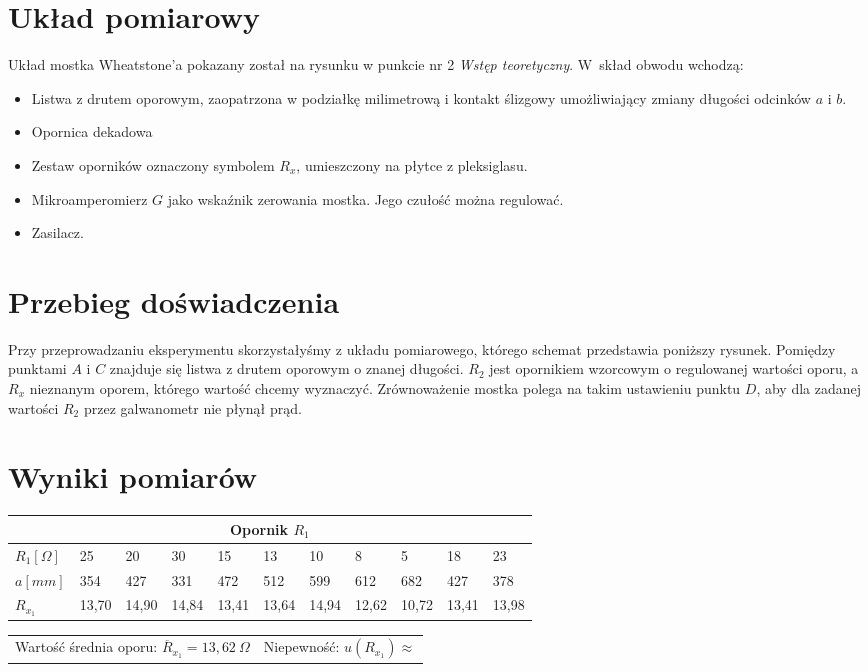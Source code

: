 \documentclass[a4paper,11pt]{article}
\begin{document}
\section{Układ pomiarowy}
Układ mostka Wheatstone’a pokazany został na rysunku w punkcie nr 2 \textit{Wstęp teoretyczny}. W~skład obwodu wchodzą:
\begin{itemize}
\item Listwa z drutem oporowym, zaopatrzona w podziałkę milimetrową i kontakt ślizgowy umożliwiający zmiany długości odcinków $a$ i $b$.
\item  Opornica dekadowa
\item  Zestaw oporników oznaczony symbolem $R_x$, umieszczony na płytce z pleksiglasu.
\item Mikroamperomierz $G$ jako wskaźnik zerowania mostka. Jego czułość można regulować.
\item Zasilacz.
\end{itemize}

\section{Przebieg doświadczenia}
Przy przeprowadzaniu eksperymentu skorzystałyśmy z układu pomiarowego, którego schemat przedstawia poniższy rysunek. Pomiędzy punktami $A$ i $C$ znajduje się listwa z  drutem oporowym o znanej długości. $R_2$ jest opornikiem wzorcowym o regulowanej wartości oporu, a $R_x$ nieznanym oporem, którego wartość chcemy wyznaczyć. Zrównoważenie mostka polega na takim ustawieniu punktu $D$, aby dla zadanej wartości $R_2$ przez galwanometr nie płynął prąd.

\section{Wyniki pomiarów}


\begin{table}[!ht]
\setlength{\extrarowheight}{5pt}
\centering
\begin{tabularx}{\textwidth}{XXXXXXXXXXX}

\multicolumn{11}{c}{\textbf{Opornik $R_1$}}\\        
\hline
$R_1[\Omega]$  & 25 & 20 & 30 & 15 & 13 & 10 & 8 & 5 & 18 & 23 \\
\hline
$a[mm]$  & 354 & 427 & 331 & 472 & 512 & 599 & 612 & 682 & 427 & 378  \\
\hline
$R_{x_1}$ & 13,70 &	14,90 &	14,84 &	13,41 &	13,64 &	14,94 &	12,62 &	10,72 &	13,41 &	13,98
\\    
\hline   
\end{tabularx}
\begin{tabularx}{\textwidth}{XX}
Wartość średnia oporu: $\overline{R}_{x_1}= 13,62~\Omega$ & Niepewność: $u(R_{x_1})\approx $\\

\end{tabularx}
\end{table}
\end{document}
